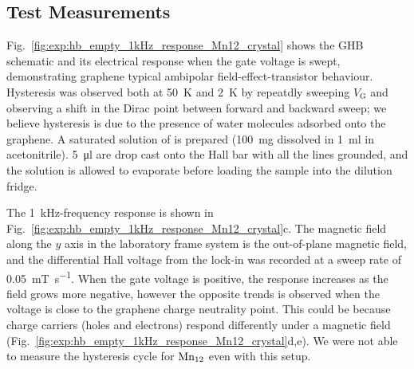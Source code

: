 \subsection{Test Measurements}

Fig.~\ref{fig:exp:hb_empty_1kHz_response_Mn12_crystal} shows the \gls{GHB} schematic and its electrical response when the gate voltage is swept, demonstrating graphene typical ambipolar field-effect-transistor behaviour. Hysteresis was observed both at \SI{50}{\kelvin} and \SI{2}{\kelvin} by repeatdly sweeping $V_\textrm{G}$ and observing a shift in the Dirac point between forward and backward sweep; we believe hysteresis is due to  the presence of water molecules adsorbed onto the graphene. A saturated solution of  is prepared (\SI{100}{\milli\gram} dissolved in \SI{1}{\milli\litre} in acetonitrile). \SI{5}{\micro\litre} are drop cast onto the Hall bar with all the lines grounded, and the solution is allowed to evaporate before loading the sample into the dilution fridge.

The \SI{1}{\kilo\hertz}-frequency response is shown in Fig.~\ref{fig:exp:hb_empty_1kHz_response_Mn12_crystal}c. The magnetic field along the $y$ axis in the laboratory frame system is the out-of-plane magnetic field, and the differential Hall voltage from the lock-in was recorded at a sweep rate of \SI{0.05}{\milli\tesla\per\second}. When the gate voltage is positive, the response increases as the field grows more negative, however the opposite trends is observed when the voltage is close to the graphene charge neutrality point. This could be because charge carriers (holes and electrons) respond differently under a magnetic field (Fig.~\ref{fig:exp:hb_empty_1kHz_response_Mn12_crystal}d,e). We were not able to measure the hysteresis cycle for $\ce{Mn12}$ even with this setup.

